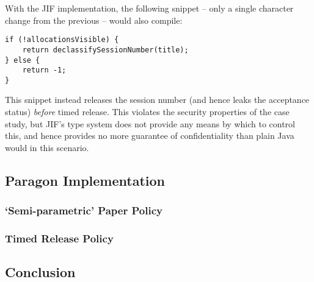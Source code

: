 With the JIF implementation, the following snippet -- only a single character change from the previous -- would also compile:

\begin{verbatim}
if (!allocationsVisible) {
	return declassifySessionNumber(title);
} else {
	return -1;
}
\end{verbatim}

This snippet instead releases the session number (and hence leaks the acceptance status) \textit{before} timed release. This violates the security properties of the case study, but JIF's type system does not provide any means by which to control this, and hence provides no more guarantee of confidentiality than plain Java would in this scenario.

\subsection{Paragon Implementation}

\subsubsection{`Semi-parametric' Paper Policy}

\subsubsection{Timed Release Policy}

\subsection{Conclusion}